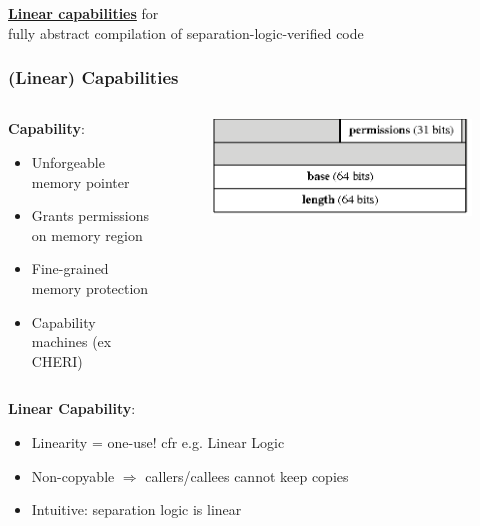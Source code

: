 \documentclass{beamer}
\begin{document}
\begin{frame}[plain,c]

\begin{center}
\Huge \underline{\textbf{Linear capabilities}} for\\  fully abstract
compilation of separation-logic-verified code
\end{center}

\end{frame}



\begin{frame}
\frametitle{(Linear) Capabilities}

\begin{columns}
\begin{column}{0.5\textwidth}
	\textbf{Capability}: %
\begin{itemize}
\item Unforgeable memory pointer
\item Grants permissions on memory region
\item Fine-grained memory protection
\item Capability machines (ex CHERI)
\end{itemize}
\end{column}
\begin{column}{0.5\textwidth}
\begin{figure}
\includegraphics[width=\linewidth]{Capability}%
\end{figure}
\end{column}
\end{columns}
\vspace{.5em}


\textbf{Linear Capability}: %
\begin{itemize}
\item Linearity = one-use! cfr e.g. Linear Logic
\item Non-copyable
$\Rightarrow$ callers/callees cannot keep copies
\item Intuitive: separation logic is linear
\end{itemize}
\end{frame}
\end{document}
